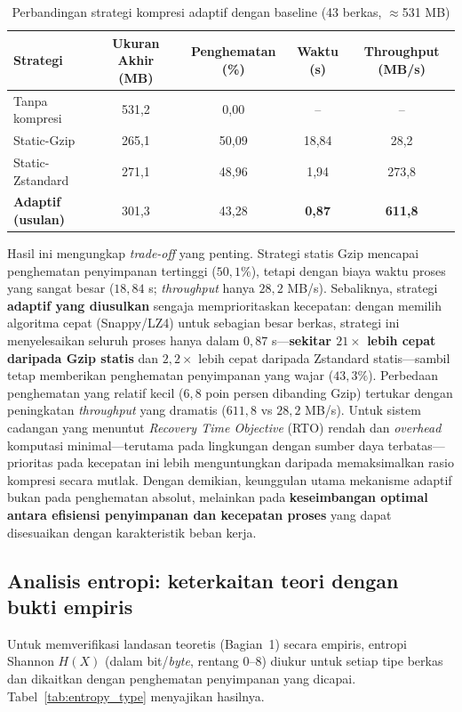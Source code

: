 \documentclass{iaesarticle}
\begin{document}
\begin{table}[H]
\centering
\fontsize{8pt}{10pt}\selectfont
\caption{Perbandingan strategi kompresi adaptif dengan baseline (43 berkas, $\approx$531 MB)}
\label{tab:baseline_comparison}
\begin{tabular}{l c c c c}
\hline
\textbf{Strategi} & \textbf{Ukuran Akhir (MB)} & \textbf{Penghematan (\%)} & \textbf{Waktu (s)} & \textbf{Throughput (MB/s)} \\
\hline
Tanpa kompresi        & 531,2 & 0,00  & --    & -- \\
Static-Gzip           & 265,1 & 50,09 & 18,84 & 28,2 \\
Static-Zstandard      & 271,1 & 48,96 & 1,94  & 273,8 \\
\textbf{Adaptif (usulan)} & 301,3 & 43,28 & \textbf{0,87} & \textbf{611,8} \\
\hline
\end{tabular}
\end{table}

Hasil ini mengungkap \textit{trade-off} yang penting. Strategi statis Gzip mencapai penghematan penyimpanan tertinggi ($50{,}1\%$), tetapi dengan biaya waktu proses yang sangat besar ($18{,}84$ s; \textit{throughput} hanya $28{,}2$ MB/s). Sebaliknya, strategi \textbf{adaptif yang diusulkan} sengaja memprioritaskan kecepatan: dengan memilih algoritma cepat (Snappy/LZ4) untuk sebagian besar berkas, strategi ini menyelesaikan seluruh proses hanya dalam $0{,}87$ s---\textbf{sekitar $21\times$ lebih cepat daripada Gzip statis} dan $2{,}2\times$ lebih cepat daripada Zstandard statis---sambil tetap memberikan penghematan penyimpanan yang wajar ($43{,}3\%$). Perbedaan penghematan yang relatif kecil ($6{,}8$ poin persen dibanding Gzip) tertukar dengan peningkatan \textit{throughput} yang dramatis ($611{,}8$ vs $28{,}2$ MB/s). Untuk sistem cadangan yang menuntut \textit{Recovery Time Objective} (RTO) rendah dan \textit{overhead} komputasi minimal---terutama pada lingkungan dengan sumber daya terbatas---prioritas pada kecepatan ini lebih menguntungkan daripada memaksimalkan rasio kompresi secara mutlak. Dengan demikian, keunggulan utama mekanisme adaptif bukan pada penghematan absolut, melainkan pada \textbf{keseimbangan optimal antara efisiensi penyimpanan dan kecepatan proses} yang dapat disesuaikan dengan karakteristik beban kerja.

\subsection{Analisis entropi: keterkaitan teori dengan bukti empiris}
Untuk memverifikasi landasan teoretis (Bagian~1) secara empiris, entropi Shannon $H(X)$ (dalam bit/\textit{byte}, rentang 0--8) diukur untuk setiap tipe berkas dan dikaitkan dengan penghematan penyimpanan yang dicapai. Tabel~\ref{tab:entropy_type} menyajikan hasilnya.
\end{document}
